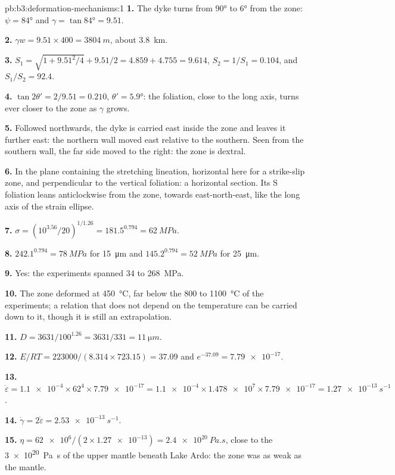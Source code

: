 \begin{solution}{pb:b3:deformation-mechanisms:1}
\textbf{1.} The dyke turns from \ang{90} to \ang{6} from the zone: $\psi =
\ang{84}$ and $\gamma = \tan\ang{84} = 9.51$.

\textbf{2.} $\gamma w = 9.51\times400 = \qty{3804}{m}$, about \qty{3.8}{km}.

\textbf{3.} $S_1 = \sqrt{1 + 9.51^2/4} + 9.51/2 = 4.859 + 4.755 = 9.614$,
$S_2 = 1/S_1 = 0.104$, and $S_1/S_2 = 92.4$.

\textbf{4.} $\tan2\theta' = 2/9.51 = 0.210$, $\theta' = \ang{5.9}$: the
foliation, close to the long axis, turns ever closer to the zone as $\gamma$
grows.

\textbf{5.} Followed northwards, the dyke is carried east inside the zone and
leaves it further east: the northern wall moved east relative to the southern.
Seen from the southern wall, the far side moved to the right: the zone is
dextral.

\textbf{6.} In the plane containing the stretching lineation, horizontal here
for a strike-slip zone, and perpendicular to the vertical foliation: a
horizontal section. Its S foliation leans anticlockwise from the zone, towards
east-north-east, like the long axis of the strain ellipse.

\textbf{7.} $\sigma = (10^{3.56}/20)^{1/1.26} = 181.5^{0.794} = \qty{62}{MPa}$.

\textbf{8.} $242.1^{0.794} = \qty{78}{MPa}$ for \qty{15}{\micro m} and
$145.2^{0.794} = \qty{52}{MPa}$ for \qty{25}{\micro m}.

\textbf{9.} Yes: the experiments spanned 34 to \qty{268}{MPa}.

\textbf{10.} The zone deformed at \qty{450}{\celsius}, far below the 800 to
\qty{1100}{\celsius} of the experiments; a relation that does not depend on
the temperature can be carried down to it, though it is still an
extrapolation.

\textbf{11.} $D = 3631/100^{1.26} = 3631/331 = \qty{11}{\micro m}$.

\textbf{12.} $E/RT = 223000/(8.314\times723.15) = 37.09$ and $e^{-37.09} =
\num{7.79e-17}$.

\textbf{13.} $\dot\varepsilon = \num{1.1e-4}\times62^4\times\num{7.79e-17} =
\num{1.1e-4}\times\num{1.478e7}\times\num{7.79e-17} = \qty{1.27e-13}{s^{-1}}$.

\textbf{14.} $\dot\gamma = 2\dot\varepsilon = \qty{2.53e-13}{s^{-1}}$.

\textbf{15.} $\eta = \num{62e6}/(2\times\num{1.27e-13}) = \qty{2.4e20}{Pa.s}$,
close to the \qty{3e20}{Pa.s} of the upper mantle beneath Lake Ardo: the zone
was as weak as the mantle.


\end{solution}
